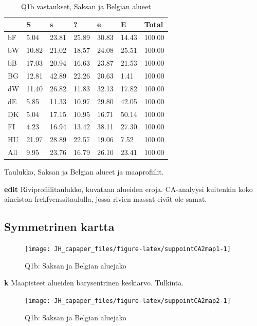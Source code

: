 \documentclass[
  finnish,
]{book}
\begin{document}
\begin{table}

\caption{\label{tab:BeDealueTable1}Q1b vastaukset, Saksan ja Belgian alueet}
\centering
\begin{tabular}[t]{lllllll}
\toprule
  & S & s & ? & e & E & Total\\
\midrule
bF & 5.04 & 23.81 & 25.89 & 30.83 & 14.43 & 100.00\\
bW & 10.82 & 21.02 & 18.57 & 24.08 & 25.51 & 100.00\\
bB & 17.03 & 20.94 & 16.63 & 23.87 & 21.53 & 100.00\\
BG & 12.81 & 42.89 & 22.26 & 20.63 & 1.41 & 100.00\\
dW & 11.40 & 26.82 & 11.83 & 32.13 & 17.82 & 100.00\\
\addlinespace
dE & 5.85 & 11.33 & 10.97 & 29.80 & 42.05 & 100.00\\
DK & 5.04 & 17.15 & 10.95 & 16.71 & 50.14 & 100.00\\
FI & 4.23 & 16.94 & 13.42 & 38.11 & 27.30 & 100.00\\
HU & 21.97 & 28.89 & 22.57 & 19.06 & 7.52 & 100.00\\
All & 9.95 & 23.76 & 16.79 & 26.10 & 23.41 & 100.00\\
\bottomrule
\end{tabular}
\end{table}

Taulukko, Saksan ja Belgian alueet ja maaprofiilit.

\textbf{edit} Riviprofiilitaulukko, kuvataan alueiden eroja. CA-analyysi kuitenkin koko
aineiston frekfvenssitaululla, jossa rivien massat eivät ole samat.

\hypertarget{symmetrinen-kartta}{%
\subsection{Symmetrinen kartta}\label{symmetrinen-kartta}}

\begin{figure}

{\centering \texttt{[image: JH\_capaper\_files/figure-latex/suppointCA2map1-1]} 

}

\caption{Q1b: Saksan ja  Belgian aluejako }\label{fig:suppointCA2map1}
\end{figure}

\textbf{k} Maapisteet alueiden barysentrinen keskiarvo. Tulkinta.

\begin{figure}

{\centering \texttt{[image: JH\_capaper\_files/figure-latex/suppointCA2map2-1]} 

}

\caption{Q1b: Saksan ja  Belgian aluejako }\label{fig:suppointCA2map2}
\end{figure}
\end{document}
